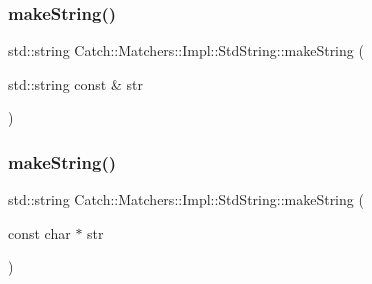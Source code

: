 \subsubsection{\texorpdfstring{make\+String()}{makeString()}\hspace{0.1cm}{\footnotesize\ttfamily [1/2]}}
{\footnotesize\ttfamily std\+::string Catch\+::\+Matchers\+::\+Impl\+::\+Std\+String\+::make\+String (\begin{DoxyParamCaption}\item[{std\+::string const \&}]{str }\end{DoxyParamCaption})\hspace{0.3cm}{\ttfamily [inline]}}

\hypertarget{namespace_catch_1_1_matchers_1_1_impl_1_1_std_string_a42a104fb88baf158ed3b7d0d422afdaa}{}\label{namespace_catch_1_1_matchers_1_1_impl_1_1_std_string_a42a104fb88baf158ed3b7d0d422afdaa} 
\subsubsection{\texorpdfstring{make\+String()}{makeString()}\hspace{0.1cm}{\footnotesize\ttfamily [2/2]}}
{\footnotesize\ttfamily std\+::string Catch\+::\+Matchers\+::\+Impl\+::\+Std\+String\+::make\+String (\begin{DoxyParamCaption}\item[{const char $\ast$}]{str }\end{DoxyParamCaption})\hspace{0.3cm}{\ttfamily [inline]}}

